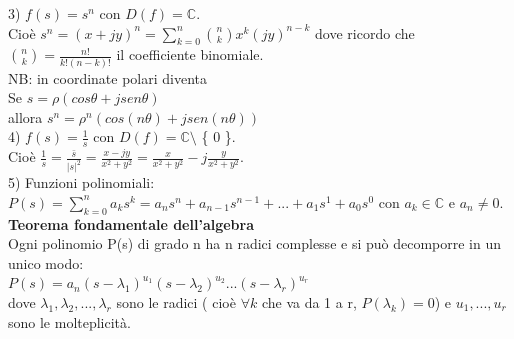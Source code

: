 3) $ f(s) = s^{n}$ con $ D(f) = \mathbb{C}$.\\
Cioè $ s^{n} = (x+jy)^{n} = \sum_{k=0}^n \binom{n}{k} x^{k} (jy)^{n-k} $ dove ricordo che $ \binom{n}{k} = \frac{n!}{k! (n-k)!} $ il coefficiente binomiale. \\
NB: in coordinate polari diventa \\
Se $ s = \rho (cos\theta + j sen\theta) $ \\
allora $ s^{n} = \rho^{n} (cos(n\theta) + j sen(n\theta ) ) $ \\

4) $ f(s) = \frac{1}{s}$ con $ D(f) = \mathbb{C} \setminus$ \{ 0 \}.\\
Cioè $ \frac{1}{s} = \frac{ \bar{s} }{ |s|^{2}} = \frac{x-jy}{x^{2} + y^{2}} = \frac{ x }{ x^{2} + y^{2} } - j \frac{ y }{ x^{2} + y^{2} } $.\\

5) Funzioni polinomiali:\\
$ P(s) = \sum_{k=0}^n a_{k} s^{k} = a_{n} s^{n} + a_{n-1} s^{n-1} +...+a_{1} s^{1}+a_{0} s^{0} $ con $ a_{k} \in \mathbb{C} $ e $ a_{n} \neq 0$. \\

\textbf{Teorema fondamentale dell'algebra}\\
Ogni polinomio P(s) di grado n ha n radici complesse e si può decomporre in un unico modo:\\
$ P(s) = a_{n} (s- \lambda_{1})^{u_{1}} (s- \lambda_{2})^{u_{2}} ... (s- \lambda_{r})^{u_{r}} $ \\
dove $ \lambda_{1}, \lambda_{2},...,\lambda_{r} $ sono le radici ( cioè $ \forall k $ che va da 1 a r, $ P(\lambda_{k}) = 0$) e $ u_{1},...,u_{r} $ sono le molteplicità.\\

\pagebreak

